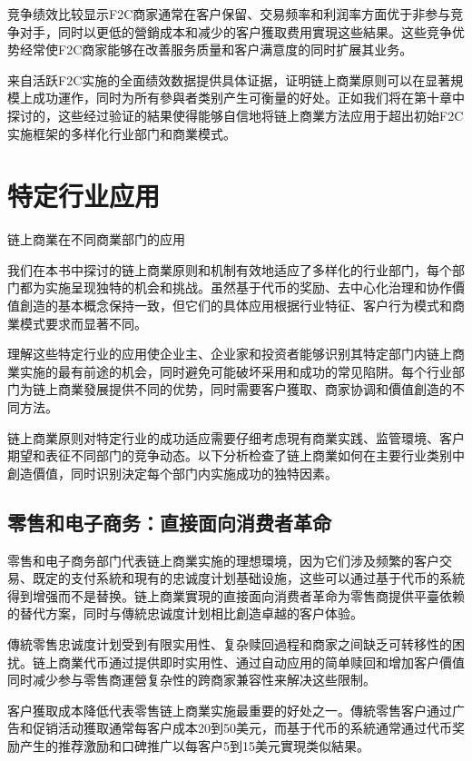 \documentclass[
  Letterpaper,
]{scrbook}
\begin{document}
竞争绩效比较显示F2C商家通常在客户保留、交易频率和利润率方面优于非参与竞争对手，同时以更低的營銷成本和减少的客户獲取费用實現这些結果。这些竞争优势经常使F2C商家能够在改善服务质量和客户满意度的同时扩展其业务。

来自活跃F2C实施的全面绩效数据提供具体证据，证明链上商業原则可以在显著規模上成功運作，同时为所有參與者类别产生可衡量的好处。正如我们将在第十章中探讨的，这些经过验证的結果使得能够自信地将链上商業方法应用于超出初始F2C实施框架的多样化行业部门和商業模式。

\chapter{特定行业应用}\label{sec-industry-applications}

链上商業在不同商業部门的应用

我们在本书中探讨的链上商業原则和机制有效地适应了多样化的行业部门，每个部门都为实施呈现独特的机会和挑战。虽然基于代币的奖励、去中心化治理和协作價值創造的基本概念保持一致，但它们的具体应用根据行业特征、客户行为模式和商業模式要求而显著不同。

理解这些特定行业的应用使企业主、企业家和投资者能够识别其特定部门内链上商業实施的最有前途的机会，同时避免可能破坏采用和成功的常见陷阱。每个行业部门为链上商業發展提供不同的优势，同时需要客户獲取、商家协调和價值創造的不同方法。

链上商業原则对特定行业的成功适应需要仔细考虑現有商業实践、监管環境、客户期望和表征不同部门的竞争动态。以下分析检查了链上商業如何在主要行业类别中創造價值，同时识别決定每个部门内实施成功的独特因素。

\section{零售和电子商务：直接面向消费者革命}\label{ux96f6ux552eux548cux7535ux5b50ux5546ux52a1ux76f4ux63a5ux9762ux5411ux6d88ux8d39ux8005ux9769ux547d}

零售和电子商务部门代表链上商業实施的理想環境，因为它们涉及频繁的客户交易、既定的支付系統和現有的忠诚度计划基础设施，这些可以通过基于代币的系統得到增强而不是替换。链上商業實現的直接面向消费者革命为零售商提供平臺依赖的替代方案，同时与傳統忠诚度计划相比創造卓越的客户体验。

傳統零售忠诚度计划受到有限实用性、复杂赎回過程和商家之间缺乏可转移性的困扰。链上商業代币通过提供即时实用性、通过自动应用的简单赎回和增加客户價值同时减少参与零售商運營复杂性的跨商家兼容性来解决这些限制。

客户獲取成本降低代表零售链上商業实施最重要的好处之一。傳統零售客户通过广告和促销活动獲取通常每客户成本20到50美元，而基于代币的系統通常通过代币奖励产生的推荐激励和口碑推广以每客户5到15美元實現类似結果。
\end{document}
